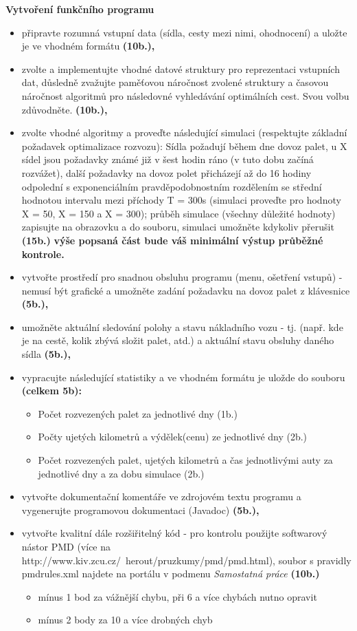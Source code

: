 \documentclass[ 12pt, a4paper]{report}
\begin{document}
\textbf{Vytvoření funkčního programu}\newline
\begin{itemize}
  \item připravte rozumná vstupní data (sídla, cesty mezi nimi, ohodnocení) a uložte je ve vhodném formátu \textbf{(10b.),}
  \item zvolte a implementujte vhodné datové struktury pro reprezentaci vstupních dat, důsledně zvažujte paměťovou náročnost zvolené struktury a časovou náročnost algoritmů pro následovné vyhledávání optimálních cest. Svou volbu zdůvodněte. \textbf{(10b.),}
  \item zvolte vhodné algoritmy a proveďte následující simulaci (respektujte základní požadavek optimalizace rozvozu): Sídla požadují během dne dovoz palet, u X sídel jsou požadavky známé již v šest hodin ráno (v tuto dobu začíná rozvážet), další požadavky na dovoz polet přicházejí až do 16 hodiny odpolední s exponenciálním pravděpodobnostním rozdělením se střední hodnotou intervalu mezi příchody T = 300s (simulaci proveďte pro hodnoty X = 50, X = 150 a X = 300); průběh simulace (všechny důležité hodnoty) zapisujte na obrazovku a do souboru, simulaci umožněte kdykoliv přerušit \textbf{(15b.)}\newline
  \textbf{výše popsaná část bude váš minimální výstup průběžné kontrole.}
  \item vytvořte prostředí pro snadnou obsluhu programu (menu, ošetření vstupů) - nemusí být grafické a umožněte zadání požadavku na dovoz palet z klávesnice \textbf{(5b.),}
  \item umožněte aktuální sledování polohy a stavu nákladního vozu - tj. (např. kde je na cestě, kolik zbývá složit palet, atd.) a aktuální stavu obsluhy daného sídla \textbf{(5b.),}
  \item vypracujte následující statistiky a ve vhodném formátu je uložde do souboru \textbf{(celkem 5b):}
  \begin{itemize}
    \item Počet rozvezených palet za jednotlivé dny (1b.)
    \item Počty ujetých kilometrů a výdělek(cenu) ze jednotlivé dny (2b.)
    \item Počet rozvezených palet, ujetých kilometrů a čas jednotlivými auty za jednotlivé dny a za dobu simulace (2b.)
  \end{itemize}
  \item vytvořte dokumentační komentáře ve zdrojovém textu programu a vygenerujte programovou dokumentaci (Javadoc) \textbf{(5b.),}
  \item vytvořte kvalitní dále rozšiřitelný kód - pro kontrolu použijte softwarový nástor PMD (více na http://www.kiv.zcu.cz/~herout/pruzkumy/pmd/pmd.html), soubor s pravidly pmdrules.xml najdete na portálu v podmenu {\it Samostatná práce} \textbf{(10b.)}
  \begin{itemize}
    \item mínus 1 bod za vážnější chybu, při 6 a více chybách nutno opravit
    \item mínus 2 body za 10 a více drobných chyb
  \end{itemize}
\end{itemize}
\end{document}
